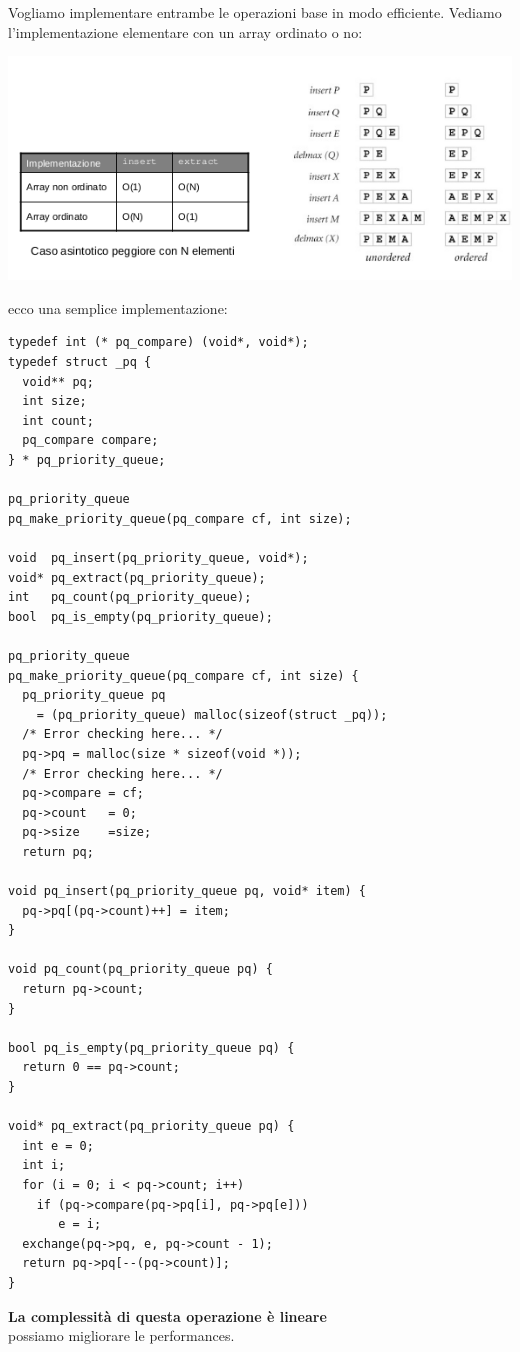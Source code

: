\documentclass[a4paper,12pt, oneside]{book}
\begin{document}
\newpage
Vogliamo implementare entrambe le operazioni base in modo efficiente. Vediamo l'implementazione elementare
con un array ordinato o no:
\begin{center}
\includegraphics[scale=2.5]{img/c6.png}
\end{center}
ecco una semplice implementazione:
\begin{verbatim}
typedef int (* pq_compare) (void*, void*);
typedef struct _pq {
  void** pq;
  int size;
  int count;
  pq_compare compare;
} * pq_priority_queue;

pq_priority_queue
pq_make_priority_queue(pq_compare cf, int size);

void  pq_insert(pq_priority_queue, void*);
void* pq_extract(pq_priority_queue);
int   pq_count(pq_priority_queue);
bool  pq_is_empty(pq_priority_queue);

pq_priority_queue
pq_make_priority_queue(pq_compare cf, int size) {
  pq_priority_queue pq
    = (pq_priority_queue) malloc(sizeof(struct _pq));
  /* Error checking here... */
  pq->pq = malloc(size * sizeof(void *));
  /* Error checking here... */
  pq->compare = cf;
  pq->count   = 0;
  pq->size    =size;
  return pq;
  
void pq_insert(pq_priority_queue pq, void* item) {
  pq->pq[(pq->count)++] = item;
}

void pq_count(pq_priority_queue pq) {
  return pq->count;
}

bool pq_is_empty(pq_priority_queue pq) {
  return 0 == pq->count;
}

void* pq_extract(pq_priority_queue pq) {
  int e = 0;
  int i;
  for (i = 0; i < pq->count; i++)
    if (pq->compare(pq->pq[i], pq->pq[e]))
       e = i;
  exchange(pq->pq, e, pq->count - 1);
  return pq->pq[--(pq->count)];
}
\end{verbatim}
\textbf{La complessità di questa operazione è lineare}\\
possiamo migliorare le performances.\\
\end{document}
